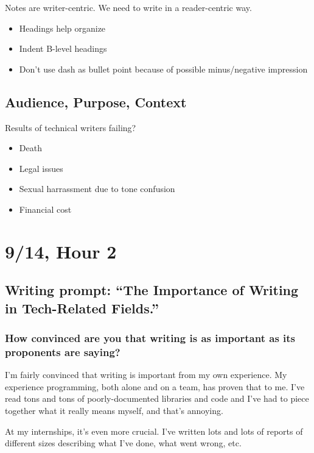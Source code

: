 Notes are writer-centric. We need to write in a reader-centric way.

\begin{itemize}
    \item Headings help organize
    \item Indent B-level headings
    \item Don't use dash as bullet point because of possible minus/negative impression
\end{itemize}

\subsection{Audience, Purpose, Context}

Results of technical writers failing?

\begin{itemize}
    \item Death
    \item Legal issues 
    \item Sexual harrassment due to tone confusion
    \item Financial cost
\end{itemize}

\section{9/14, Hour 2}

\subsection{Writing prompt: ``The Importance of Writing in Tech-Related Fields.''}

\subsubsection{How convinced are you that writing is as important as its proponents are saying?}

I'm fairly convinced that writing is important from my own experience. My experience programming, both alone and on a team, has proven that to me. I've read tons and tons of poorly-documented libraries and code and I've had to piece together what it really means myself, and that's annoying. 

At my internships, it's even more crucial. I've written lots and lots of reports of different sizes describing what I've done, what went wrong, etc.

